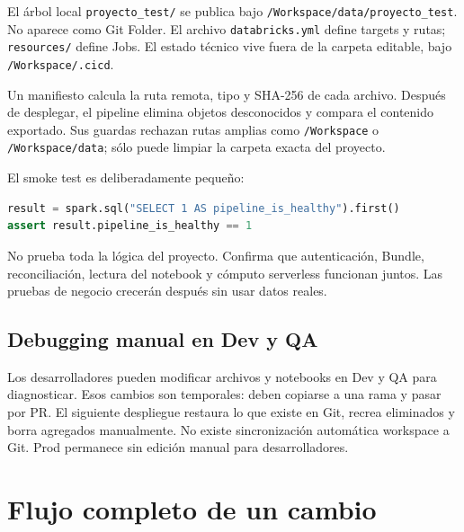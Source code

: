 \documentclass[11pt,a4paper]{article}
\begin{document}
El árbol local \texttt{proyecto\_test/} se publica bajo
\texttt{/Workspace/data/proyecto\_test}. No aparece como Git Folder. El archivo
\texttt{databricks.yml} define targets y rutas; \texttt{resources/} define Jobs. El estado técnico
vive fuera de la carpeta editable, bajo \texttt{/Workspace/.cicd}.

Un manifiesto calcula la ruta remota, tipo y SHA-256 de cada archivo. Después de desplegar, el pipeline
elimina objetos desconocidos y compara el contenido exportado. Sus guardas rechazan rutas amplias como
\texttt{/Workspace} o \texttt{/Workspace/data}; sólo puede limpiar la carpeta exacta del proyecto.

El smoke test es deliberadamente pequeño:

\begin{lstlisting}[language=Python]
result = spark.sql("SELECT 1 AS pipeline_is_healthy").first()
assert result.pipeline_is_healthy == 1
\end{lstlisting}

No prueba toda la lógica del proyecto. Confirma que autenticación, Bundle, reconciliación, lectura del
notebook y cómputo serverless funcionan juntos. Las pruebas de negocio crecerán después sin usar datos
reales.

\subsection{Debugging manual en Dev y QA}

Los desarrolladores pueden modificar archivos y notebooks en Dev y QA para diagnosticar. Esos cambios
son temporales: deben copiarse a una rama y pasar por PR. El siguiente despliegue restaura lo que
existe en Git, recrea eliminados y borra agregados manualmente. No existe sincronización automática
workspace a Git. Prod permanece sin edición manual para desarrolladores.

\section{Flujo completo de un cambio}
\end{document}
